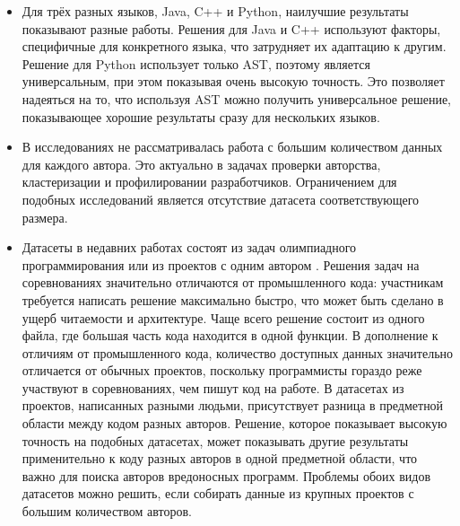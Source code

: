 \begin{itemize}
    \item Для трёх разных языков, Java, C++ и Python, наилучшие результаты показывают разные работы. Решения для Java \cite{Yang2017} и C++ \cite{Caliskan2015} используют факторы, специфичные для конкретного языка, что затрудняет их адаптацию к другим. Решение для Python \cite{Alsulami2017} использует только AST, поэтому является универсальным, при этом показывая очень высокую точность. Это позволяет надеяться на то, что используя AST можно получить универсальное решение, показывающее хорошие результаты сразу для нескольких языков.
    \item В исследованиях не рассматривалась работа с большим количеством данных для каждого автора. Это актуально в задачах проверки авторства, кластеризации и профилировании разработчиков. Ограничением для подобных исследований является отсутствие датасета соответствующего размера.
    \item Датасеты в недавних работах состоят из задач олимпиадного программирования \cite{Rosenblum2011,Caliskan2015,Alsulami2017,Simko2018} или из проектов с одним автором \cite{Zhang2017,Alsulami2017,Wisse2015,Bandara2013,Yang2017}. Решения задач на соревнованиях значительно отличаются от промышленного кода: участникам требуется написать решение максимально быстро, что может быть сделано в ущерб читаемости и архитектуре. Чаще всего решение состоит из одного файла, где большая часть кода находится в одной функции. В дополнение к отличиям от промышленного кода, количество доступных данных значительно отличается от обычных проектов, поскольку программисты гораздо реже участвуют в соревнованиях, чем пишут код на работе. В датасетах из проектов, написанных разными людьми, присутствует разница в предметной области между кодом разных авторов. Решение, которое показывает высокую точность на подобных датасетах, может показывать другие результаты применительно к коду разных авторов в одной предметной области, что важно для поиска авторов вредоносных программ. Проблемы обоих видов датасетов можно решить, если собирать данные из крупных проектов с большим количеством авторов.
\end{itemize}